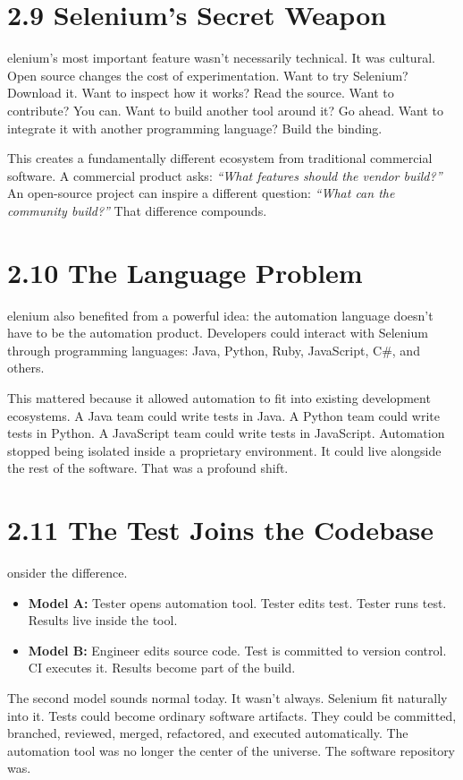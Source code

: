 \documentclass[11pt, a4paper, openany]{book}
\newcommand{\initialcap}[1]{{\fontfamily{lmss}\selectfont\huge\textbf{#1}}}
\begin{document}
\section{2.9 Selenium's Secret Weapon}
\noindent \initialcap{S}elenium's most important feature wasn't necessarily technical. It was cultural. Open source changes the cost of experimentation. Want to try Selenium? Download it. Want to inspect how it works? Read the source. Want to contribute? You can. Want to build another tool around it? Go ahead. Want to integrate it with another programming language? Build the binding.

This creates a fundamentally different ecosystem from traditional commercial software. A commercial product asks: \textit{``What features should the vendor build?''} An open-source project can inspire a different question: \textit{``What can the community build?''} That difference compounds.

\section{2.10 The Language Problem}
\noindent \initialcap{S}elenium also benefited from a powerful idea: the automation language doesn't have to be the automation product. Developers could interact with Selenium through programming languages: Java, Python, Ruby, JavaScript, C\#, and others.

This mattered because it allowed automation to fit into existing development ecosystems. A Java team could write tests in Java. A Python team could write tests in Python. A JavaScript team could write tests in JavaScript. Automation stopped being isolated inside a proprietary environment. It could live alongside the rest of the software. That was a profound shift.

\section{2.11 The Test Joins the Codebase}
\noindent \initialcap{C}onsider the difference.
\begin{itemize}
    \item \textbf{Model A:} Tester opens automation tool. Tester edits test. Tester runs test. Results live inside the tool.
    \item \textbf{Model B:} Engineer edits source code. Test is committed to version control. CI executes it. Results become part of the build.
\end{itemize}
The second model sounds normal today. It wasn't always. Selenium fit naturally into it. Tests could become ordinary software artifacts. They could be committed, branched, reviewed, merged, refactored, and executed automatically. The automation tool was no longer the center of the universe. The software repository was.
\end{document}
